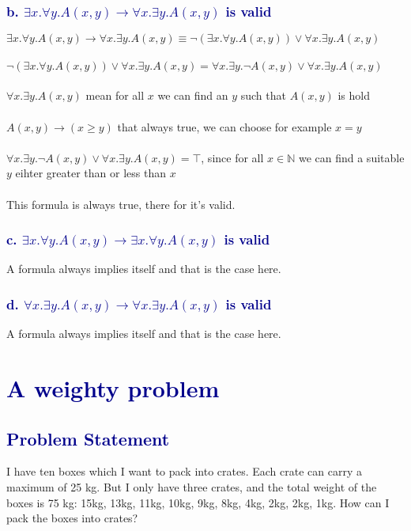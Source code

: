 \documentclass[12pt]{article}
\theoremstyle{definition}
\theoremstyle{plain}
\begin{document}
\subsubsection*{\textcolor{darkblue}{b. $\exists x. \forall y.A(x,y) \rightarrow \forall x. \exists y.A(x,y)$ is valid}}
$\exists x. \forall y.A(x,y) \rightarrow \forall x. \exists y.A(x,y) \equiv \neg(\exists x. \forall y.A(x,y)) \vee \forall x. \exists y.A(x,y)$\\\\
$\neg(\exists x. \forall y.A(x,y)) \vee \forall x. \exists y.A(x,y) = \forall x. \exists y.\neg A(x,y) \vee \forall x. \exists y.A(x,y)$\\\\
$\forall x. \exists y. A(x,y) $ mean for all $x$ we can find an $y$ such that $A(x,y)$ is hold\\\\
$A(x,y) \rightarrow (x \geq y)$ that always true, we can choose for example $x = y$\\\\
$\forall x. \exists y.\neg A(x,y) \vee \forall x. \exists y.A(x,y) = \top$, since for all $x \in \mathbb{N}$ we can find a suitable $y$ eihter greater than or less than $x$\\\\
This formula is always true, there for it's valid.
\subsubsection*{\textcolor{darkblue}{c. $\exists x.\forall y.A(x,y) \rightarrow \exists x. \forall y.A(x,y)$ is valid}}
A formula always implies itself and that is the case here.

\subsubsection*{\textcolor{darkblue}{d. $\forall x.\exists y.A(x,y) \rightarrow \forall x.\exists y.A(x,y)$  is valid}}
A formula always implies itself and that is the case here.
\newpage
\section*{\textcolor{darkblue}{A weighty problem}}
\subsection*{\textcolor{darkblue}{Problem Statement}}

\vspace{0.5cm}
\begin{tcolorbox}[colback=lightgray, colframe=darkblue, boxrule=1pt]
I have ten boxes which I want to pack into crates. Each crate can carry a maximum of 25 kg. But I only have three crates, and the total weight of the boxes is 75 kg: 15kg, 13kg, 11kg, 10kg, 9kg, 8kg, 4kg, 2kg, 2kg, 1kg.
How can I pack the boxes into crates?
\end{tcolorbox}
\vspace{0.3cm}
\noindent
\end{document}
